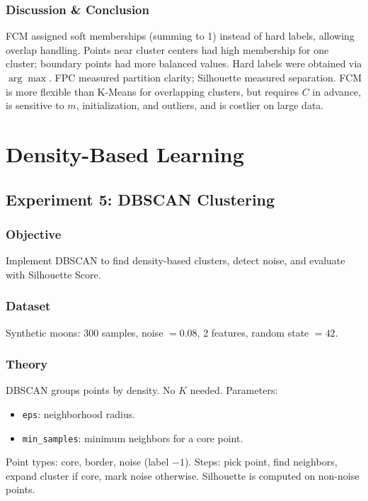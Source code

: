 \documentclass[a4paper,10pt]{article}
\begin{document}
\subsubsection{Discussion \& Conclusion}
FCM assigned soft memberships (summing to 1) instead of hard labels, allowing overlap handling. Points near cluster centers had high membership for one cluster; boundary points had more balanced values. Hard labels were obtained via \(\arg\max\). FPC measured partition clarity; Silhouette measured separation. FCM is more flexible than K-Means for overlapping clusters, but requires \(C\) in advance, is sensitive to \(m\), initialization, and outliers, and is costlier on large data.




\section{Density-Based Learning}
\subsection{Experiment 5: DBSCAN Clustering}

\subsubsection{Objective}
Implement DBSCAN to find density-based clusters, detect noise, and evaluate with Silhouette Score.

\subsubsection{Dataset}
Synthetic moons: 300 samples, noise \(=0.08\), 2 features, random state \(=42\).

\subsubsection{Theory}
DBSCAN groups points by density. No \(K\) needed. Parameters:
\begin{itemize}[nosep]
    \item \texttt{eps}: neighborhood radius.
    \item \texttt{min\_samples}: minimum neighbors for a core point.
\end{itemize}
Point types: core, border, noise (label \(-1\)). Steps: pick point, find neighbors, expand cluster if core, mark noise otherwise. Silhouette is computed on non-noise points.
\end{document}
